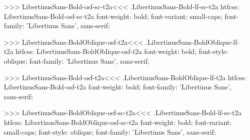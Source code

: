{{{{>>>
\<LibertinusSans-Bold-osf-sc-t2a\><<<
.LibertinusSans-Bold-lf-sc-t2a
htfcss:  LibertinusSans-Bold-osf-sc-t2a  font-weight: bold; font-variant: small-caps; font-family: 'Libertinus Sans', sans-serif;

>>>
\<LibertinusSans-BoldOblique-osf-t2a\><<<
.LibertinusSans-BoldOblique-lf-t2a
htfcss:  LibertinusSans-BoldOblique-osf-t2a  font-weight: bold; font-style: oblique; font-family: 'Libertinus Sans', sans-serif;

>>>
\<LibertinusSans-Bold-osf-t2a\><<<
.LibertinusSans-BoldOblique-lf-t2a
htfcss:  LibertinusSans-Bold-osf-t2a  font-weight: bold; font-family: 'Libertinus Sans', sans-serif;

>>>
\<LibertinusSans-BoldOblique-osf-sc-t2a\><<<
.LibertinusSans-Bold-lf-sc-t2a
htfcss:  LibertinusSans-BoldOblique-osf-sc-t2a  font-weight: bold; font-variant: small-caps; font-style: oblique; font-family: 'Libertinus Sans', sans-serif;

}}}}
